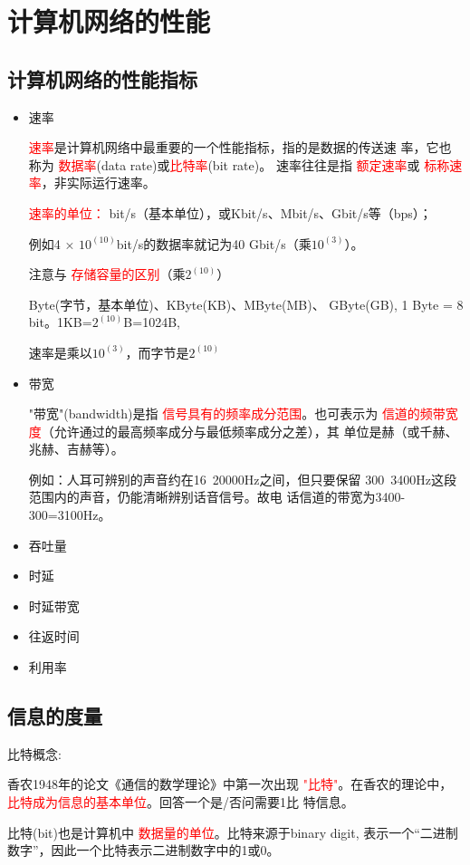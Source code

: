 \section{计算机网络的性能}
\subsection{计算机网络的性能指标}
\begin{itemize}
    \item 速率
    
    \textcolor{red}{速率}是计算机网络中最重要的一个性能指标，指的是数据的传送速
  率，它也称为
  \textcolor{red}{数据率}(data rate)或\textcolor{red}{比特率}(bit rate)。
速率往往是指
\textcolor{red}{额定速率}或
\textcolor{red}{标称速率}，非实际运行速率。

\textcolor{red}{速率的单位：}
bit/s（基本单位），或Kbit/s、Mbit/s、Gbit/s等（bps）；

例如4 × $10^(10)$bit/s的数据率就记为40 Gbit/s（乘$10^(3)$）。

注意与
\textcolor{red}{存储容量的区别}（乘$2^(10)$）

Byte(字节，基本单位)、KByte(KB)、MByte(MB)、
GByte(GB), 1 Byte = 8 bit。1KB=$2^(10)$B=1024B,

速率是乘以$10^(3)$，而字节是$2^(10)$

    \item 带宽
    
    "带宽"(bandwidth)是指
    \textcolor{red}{信号具有的频率成分范围}。也可表示为
\textcolor{red}{信道的频带宽度}（允许通过的最高频率成分与最低频率成分之差），其
单位是赫（或千赫、兆赫、吉赫等）。

例如：人耳可辨别的声音约在16~20000Hz之间，但只要保留
300~3400Hz这段范围内的声音，仍能清晰辨别话音信号。故电
话信道的带宽为3400-300=3100Hz。


    \item 吞吐量
    \item 时延
    \item 时延带宽
    \item 往返时间
    \item 利用率
\end{itemize}
\subsection{信息的度量}
比特概念:

香农1948年的论文《通信的数学理论》中第一次出现
\textcolor{red}{"比特"}。在香农的理论中，
\textcolor{red}{比特成为信息的基本单位}。回答一个是/否问需要1比
特信息。

比特(bit)也是计算机中
\textcolor{red}{数据量的单位}。比特来源于binary digit,
表示一个“二进制数字”，因此一个比特表示二进制数字中的1或0。


